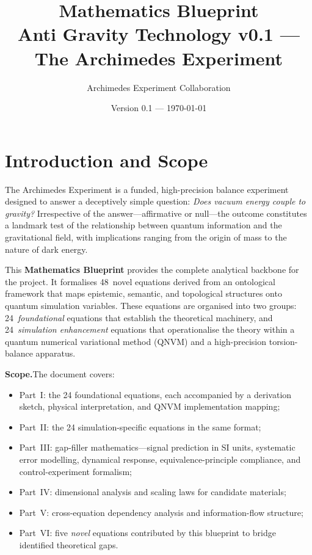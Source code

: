 \documentclass[11pt,a4paper]{article}
\title{\textbf{Mathematics Blueprint}\\[6pt]
{\large Anti Gravity Technology v0.1 --- The Archimedes Experiment}}
\author{Archimedes Experiment Collaboration}
\date{Version 0.1 --- \today}
\theoremstyle{remark}
\begin{document}

\maketitle
\thispagestyle{empty}
\newpage

\tableofcontents
\newpage

\section{Introduction and Scope}
\label{sec:intro}

The Archimedes Experiment is a funded, high-precision balance experiment designed to answer a deceptively simple question: \emph{Does vacuum energy couple to gravity?}  Irrespective of the answer---affirmative or null---the outcome constitutes a landmark test of the relationship between quantum information and the gravitational field, with implications ranging from the origin of mass to the nature of dark energy.

This \textbf{Mathematics Blueprint} provides the complete analytical backbone for the project.  It formalises 48~novel equations derived from an ontological framework that maps epistemic, semantic, and topological structures onto quantum simulation variables.  These equations are organised into two groups: 24~\emph{foundational} equations that establish the theoretical machinery, and 24~\emph{simulation enhancement} equations that operationalise the theory within a quantum numerical variational method (QNVM) and a high-precision torsion-balance apparatus.

\textbf{Scope.}\quad The document covers:
\begin{itemize}[nosep]
    \item Part~I: the 24 foundational equations, each accompanied by a derivation sketch, physical interpretation, and QNVM implementation mapping;
    \item Part~II: the 24 simulation-specific equations in the same format;
    \item Part~III: gap-filler mathematics---signal prediction in SI units, systematic error modelling, dynamical response, equivalence-principle compliance, and control-experiment formalism;
    \item Part~IV: dimensional analysis and scaling laws for candidate materials;
    \item Part~V: cross-equation dependency analysis and information-flow structure;
    \item Part~VI: five \emph{novel} equations contributed by this blueprint to bridge identified theoretical gaps.
\end{itemize}
\end{document}
